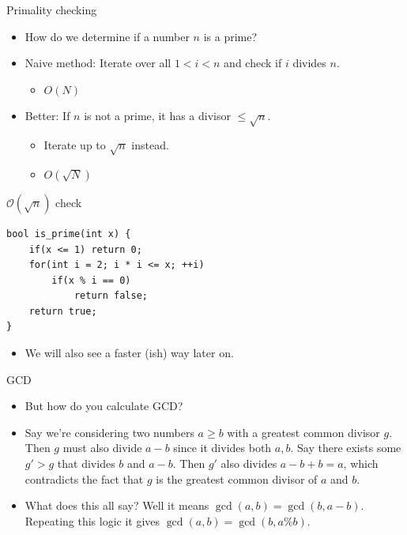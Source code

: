 \documentclass{beamer}
\begin{document}
\begin{frame}[plain]{Primality checking}
  \vspace{20pt}
  \begin{itemize}
    \item How do we determine if a number $n$ is a prime?
    \item {\color{dark green}Naive method:} Iterate over all $1 < i < n$ and check if
      $i$ divides $n$.
      \begin{itemize}
        \item  $O(N)$
      \end{itemize}
    \item {\color{dark green}Better:} If $n$ is not a prime, it has a divisor $\leq \sqrt{n}$.
      \begin{itemize}
        \item Iterate up to $\sqrt{n}$ instead.
        \item $O(\sqrt{N})$
      \end{itemize}
  \end{itemize}
\end{frame}

\begin{frame}{$\mathcal{O}(\sqrt{n})$ check}
\begin{verbatim}
bool is_prime(int x) {
    if(x <= 1) return 0;
    for(int i = 2; i * i <= x; ++i)
        if(x % i == 0)
            return false;
    return true;
}
\end{verbatim}

\begin{itemize}
\item<2-> We will also see a faster (ish) way later on.
\end{itemize}

\end{frame}

\begin{frame}[plain]{GCD}
  \vspace{15pt}
  \begin{itemize}
    \item But how do you calculate GCD?
    
    \item<2-> Say we're considering two numbers $a \geq b$ with a greatest common divisor $g$. Then $g$ must also divide $a - b$ since it divides both $a, b$. Say there exists some $g' > g$ that divides $b$ and $a - b$. Then $g'$ also divides $a - b + b = a$, which contradicts the fact that $g$ is the greatest common divisor of $a$ and $b$.
    
    \item<3-> What does this all say? Well it means $\gcd(a, b) = \gcd(b, a - b)$. Repeating this logic it gives $\gcd(a, b) = \gcd(b, a \% b)$.
  \end{itemize}
\end{frame}
\end{document}
